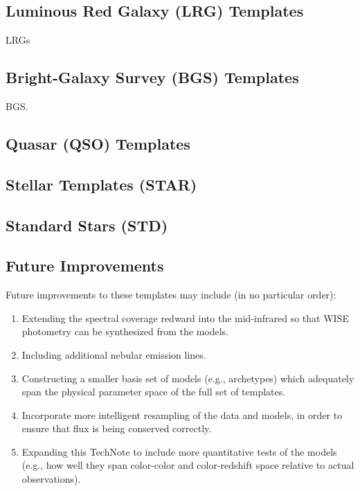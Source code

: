\documentclass[12pt]{article}
\begin{document}
\subsection{Luminous Red Galaxy (LRG) Templates} 

LRGs


\subsection{Bright-Galaxy Survey (BGS) Templates} 

BGS.


\subsection{Quasar (QSO) Templates }


\subsection{Stellar Templates (STAR)}


\subsection{Standard Stars (STD)}

\subsection{Future Improvements}

Future improvements to these templates may include (in no particular
order): 

\begin{enumerate}
\item{Extending the spectral coverage redward into the mid-infrared so
  that WISE photometry can be synthesized from the models.}
\item{Including additional nebular emission lines.}
\item{Constructing a smaller basis set of models (e.g., archetypes)
  which adequately span the physical parameter space of the full set
  of templates.}
\item{Incorporate more intelligent resampling of the data and models,
  in order to ensure that flux is being conserved correctly.}
\item{Expanding this TechNote to include more quantitative tests of
  the models (e.g., how well they span color-color and color-redshift
  space relative to actual observations).}
\end{enumerate}
\end{document}
